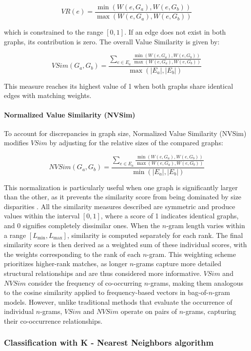 \documentclass{article}
\begin{document}
\[
VR(e) = \frac{\min(W(e, G_{a}), W(e, G_{b}))}{\max(W(e, G_{a}), W(e, G_{b}))}
\]

which is constrained to the range \([0,1]\). If an edge does not exist in both graphs, its contribution is zero. The overall Value Similarity is given by:

\[
VSim(G_{a}, G_{b}) = 
\frac{\sum_{e \in E_{a}} \frac{\min(W(e, G_{a}), W(e, G_{b}))}{\max(W(e, G_{a}), W(e, G_{b}))}}{\max(|E_{a}|, |E_{b}|)}
\]

This measure reaches its highest value of 1 when both graphs share identical edges with matching weights.

\paragraph{Normalized Value Similarity (NVSim)}

To account for discrepancies in graph size, Normalized Value Similarity (NVSim) modifies \( VSim \) by adjusting for the relative sizes of the compared graphs:

\[
NVSim(G_{a}, G_{b}) = 
\frac{\sum_{e \in E_{a}} \frac{\min(W(e, G_{a}), W(e, G_{b}))}{\max(W(e, G_{a}), W(e, G_{b}))}}{\min(|E_{a}|, |E_{b}|)}
\]

This normalization is particularly useful when one graph is significantly larger than the other, as it prevents the similarity score from being dominated by size disparities \cite{giannakopoulos2008, papadakis2016}. All the similarity measures described are symmetric and produce values within the interval \([0, 1]\), where a score of 1 indicates identical graphs, and 0 signifies completely dissimilar ones. When the \( n \)-gram length varies within a range \([L_{\min}, L_{\max}]\), similarity is computed separately for each rank. The final similarity score is then derived as a weighted sum of these individual scores, with the weights corresponding to the rank of each \( n \)-gram. This weighting scheme prioritizes higher-rank matches, as longer \( n \)-grams capture more detailed structural relationships and are thus considered more informative. \( VSim \) and \( NVSim \) consider the frequency of co-occurring \( n \)-grams, making them analogous to the cosine similarity applied to frequency-based vectors in bag-of-\( n \)-gram models. However, unlike traditional methods that evaluate the occurrence of individual \( n \)-grams, \( VSim \) and \( NVSim \) operate on pairs of \( n \)-grams, capturing their co-occurrence relationships.

\subsubsection{Classification with K - Nearest Neighbors algorithm} \label{sec:classification}
\end{document}
